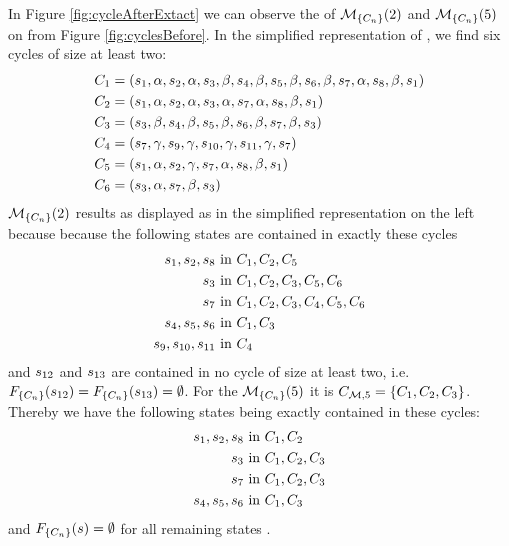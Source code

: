 \documentclass[preview]{standalone}
\begin{document}
\begin{exmp}
	In Figure \ref{fig:cycleAfterExtact} we can observe the \viewsN of ${{{{{\mathcal{M}}}}_{{\{{C}_n\}}}}}(2)$ and ${{{{{\mathcal{M}}}}_{{\{{C}_n\}}}}}(5)$ on \chgph from Figure \ref{fig:cyclesBefore}. In the simplified representation of \achgphN, we find six cycles of size at least two:
\begin{align*}
	{C}_1 &= ({s}_1, {\alpha}, {s}_2, {\alpha}, {s}_3, {\beta}, {s}_4, {\beta}, {s}_5, {\beta}, {s}_6, {\beta}, {s}_7, {\alpha}, {s}_8, {\beta}, {s}_1) \\
	{C}_2 &= ({s}_1, {\alpha}, {s}_2, {\alpha}, {s}_3, {\alpha}, {s}_7, {\alpha}, {s}_8, {\beta}, {s}_1) \\
	{C}_3 &= ({s}_3, {\beta}, {s}_4, {\beta}, {s}_5, {\beta}, {s}_6, {\beta}, {s}_7, {\beta}, {s}_3) \\
	{C}_4 &= ({s}_7, {\gamma}, {s}_9, {\gamma}, {s}_{10}, {\gamma}, {s}_{11}, {\gamma}, {s}_7) \\
	{C}_5 &= ({s}_1, {\alpha}, {s}_2, {\gamma}, {s}_7, {\alpha}, {s}_8, {\beta}, {s}_1) \\
	{C}_6 &= ({s}_3, {\alpha}, {s}_7, {\beta}, {s}_3)
\end{align*}
\viewNC ${{{{{\mathcal{M}}}}_{{\{{C}_n\}}}}}(2)$ results as displayed as in the simplified representation on the left because because the following states are contained in exactly these cycles
\begin{align*}
	{s}_1, {s}_2, {s}_8 &\text{ in } {C}_1, {C}_2, {C}_5 \\
	{s}_3 &\text{ in } {C}_1, {C}_2, {C}_3, {C}_5, {C}_6 \\
	{s}_7 &\text{ in } {C}_1, {C}_2, {C}_3, {C}_4, {C}_5, {C}_6 \\
	{s}_4, {s}_5, {s}_6 &\text{ in } {C}_1, {C}_3 \\
	{s}_9, {s}_{10}, {s}_{11} &\text{ in } {C}_4
\end{align*}
and ${s}_{12}$ and ${s}_{13}$ are contained in no cycle of size at least two, i.e. ${{F_{{\{{C}_n\}}}}}({s}_{12}) = {{F_{{\{{C}_n\}}}}}({s}_{13}) = \emptyset$. For the ${{{{{\mathcal{M}}}}_{{\{{C}_n\}}}}}(5)$ it is ${C}_{{{{\mathcal{M}}}}, 5} = \{{C}_1, {C}_2, {C}_3\}$. Thereby we have the following states being exactly contained in these cycles:
\begin{align*}
	{s}_1, {s}_2, {s}_8 &\text{ in } {C}_1, {C}_2 \\
	{s}_3 &\text{ in } {C}_1, {C}_2, {C}_3 \\
	{s}_7 &\text{ in } {C}_1, {C}_2, {C}_3 \\
	{s}_4, {s}_5, {s}_6 &\text{ in } {C}_1, {C}_3
\end{align*}
and ${{F_{{\{{C}_n\}}}}}({s}) = \emptyset$ for all remaining states \state.
\end{exmp}
\end{document}
